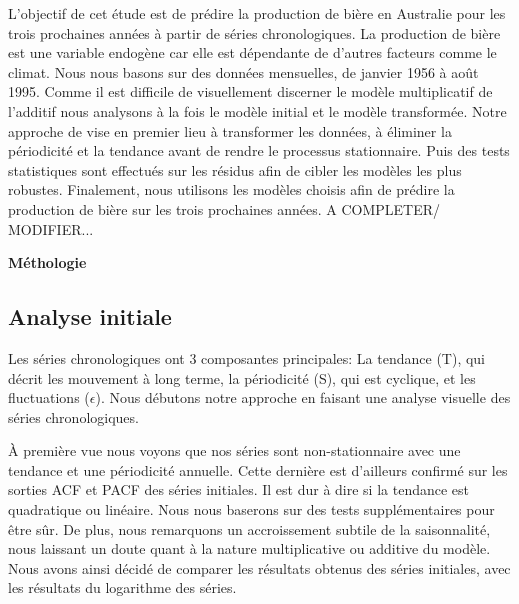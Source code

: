 \documentclass[12pt,a4paper]{book}
\newcommand{\1}{\mathds{1}}
\begin{document}
L'objectif de cet étude est de prédire la production de bière en Australie pour les trois prochaines années à partir de séries chronologiques. La production de bière est une variable endogène car elle est dépendante de d'autres facteurs comme le climat. Nous nous basons sur des données mensuelles, de janvier 1956 à août 1995. Comme il est difficile de visuellement discerner le modèle multiplicatif de l'additif nous analysons à la fois le modèle initial et le modèle transformée. Notre approche de vise en premier lieu à transformer les données, à éliminer la périodicité et la tendance avant de rendre le processus stationnaire. Puis des tests statistiques sont effectués sur les résidus afin de cibler les modèles les plus robustes. Finalement, nous utilisons les modèles choisis afin de prédire la production de bière sur les trois prochaines années. 
A COMPLETER/ MODIFIER...


\vspace{15 mm}


\noindent
{\LARGE \textbf{Méthologie}}
\vspace{5 mm}


\subsection{Analyse initiale}

Les séries chronologiques ont 3 composantes principales: La tendance (T), qui décrit les mouvement à long terme, la périodicité (S), qui est cyclique, et les fluctuations ($\epsilon$).
\vspace{5 mm}
Nous débutons notre approche en faisant une analyse visuelle des séries chronologiques. 

À première vue nous voyons que nos séries sont non-stationnaire avec une tendance et une périodicité annuelle. Cette dernière est d'ailleurs confirmé sur les sorties ACF et PACF des séries initiales. Il est dur à dire si la tendance est quadratique ou linéaire. Nous nous baserons sur des tests supplémentaires pour être sûr.  De plus, nous remarquons un accroissement subtile de la saisonnalité, nous laissant un doute quant à la nature multiplicative ou additive du modèle. Nous avons ainsi décidé de comparer les résultats obtenus des séries initiales, avec les résultats du logarithme des séries. 
\end{document}

